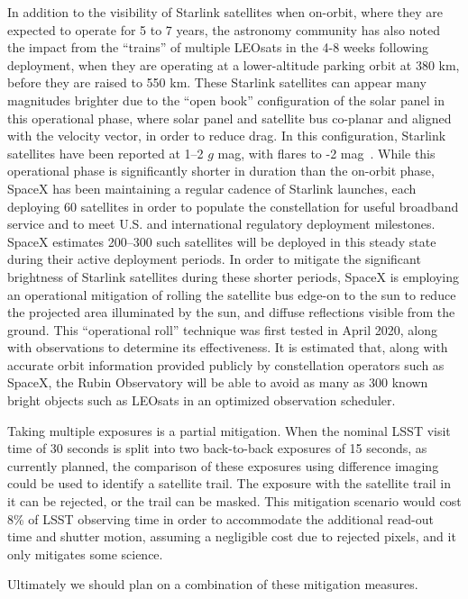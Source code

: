 \documentclass[twocolumn,trackchanges]{aastex63}
\begin{document}
In addition to the visibility of Starlink satellites when on-orbit, where they are expected to operate for 5 to 7 years, the astronomy community has also noted the impact from the ``trains'' of multiple LEOsats in the 4-8 weeks following deployment, when they are operating at a lower-altitude parking orbit at 380 km, before they are raised to 550 km.
These Starlink satellites can appear many magnitudes brighter due to the ``open book'' configuration of the solar panel in this operational phase, where solar panel and satellite bus  co-planar and aligned with the velocity vector, in order to reduce drag. In this configuration, Starlink satellites have been reported at 1--2 $g$ mag, with flares to -2 mag~\citep{2020AAS...23541003S}. While this operational phase is significantly shorter in duration than the on-orbit phase, SpaceX has been maintaining a regular cadence of Starlink launches, each deploying 60 satellites
in order to populate the constellation for useful broadband service and to meet U.S. and international regulatory deployment milestones.
SpaceX estimates 200--300 such satellites will be deployed in this steady state during their active deployment periods. In order to mitigate the significant brightness of Starlink satellites during these shorter periods, SpaceX is employing an operational mitigation of rolling the satellite bus edge-on to the sun to reduce the projected area illuminated by the sun, and diffuse reflections visible from the ground. This ``operational roll'' technique was first tested in April 2020, along with observations to determine its effectiveness. It is estimated that, along with accurate orbit information provided publicly by constellation operators such as SpaceX, the Rubin Observatory will be able to avoid as many as 300 known bright objects such as LEOsats in an optimized observation scheduler.

Taking multiple exposures is a partial mitigation. When the nominal LSST visit time of 30 seconds is split into two back-to-back exposures of 15 seconds, as currently planned, the comparison of these exposures using difference imaging could be used to identify a satellite trail. The exposure with the satellite trail in it can be rejected,  or the trail can be masked. This mitigation scenario would cost 8\% of LSST observing time in order to accommodate the additional read-out time and shutter motion, assuming a negligible cost due to rejected pixels, and it only mitigates some science.

Ultimately we should plan on a combination of  these mitigation measures.
\end{document}
